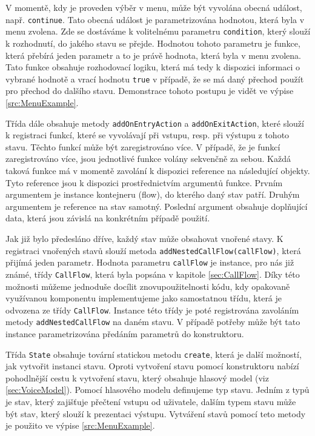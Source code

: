 \documentclass[ing,male,java,dept460,twoside]{diploma}						%
\begin{document}
V momentě, kdy je proveden výběr v menu, může být vyvolána obecná událost, např. \texttt{continue}. Tato obecná událost je parametrizována hodnotou, která byla v menu zvolena. Zde se dostáváme k volitelnému parametru \texttt{condition}, který slouží k rozhodnutí, do jakého stavu se přejde. Hodnotou tohoto parametru je funkce, která přebírá jeden parametr a to je právě hodnota, která byla v menu zvolena. Tato funkce obsahuje rozhodovací logiku, která má tedy k dispozici informaci o vybrané hodnotě a vrací hodnotu \texttt{true} v případě, že se má daný přechod použít pro přechod do dalšího stavu. Demonstrace tohoto postupu je vidět ve výpise \ref{src:MenuExample}.

Třída dále obsahuje metody \texttt{addOnEntryAction} a \texttt{addOnExitAction}, které slouží k registraci funkcí, které se vyvolávají při vstupu, resp. při výstupu z tohoto stavu. Těchto funkcí může být zaregistrováno více. V případě, že je funkcí zaregistrováno více, jsou jednotlivé funkce volány sekvenčně za sebou. Každá taková funkce má v momentě zavolání k dispozici reference na následující objekty. Tyto reference jsou k dispozici prostřednictvím argumentů funkce. Prvním argumentem je instance kontejneru (flow), do kterého daný stav patří. Druhým argumentem je reference na stav samotný. Poslední argument obsahuje doplňující data, která jsou závislá na konkrétním případě použití.

Jak již bylo předesláno dříve, každý stav může obsahovat vnořené stavy. K registraci vnořených stavů slouží metoda \texttt{addNestedCallFlow(callFlow)}, která přijímá jeden parametr. Hodnota parametru \texttt{callFlow} je instance, pro nás již známé, třídy \texttt{CallFlow}, která byla popsána v kapitole \ref{sec:CallFlow}. Díky této možnosti můžeme jednoduše docílit znovupoužitelnosti kódu, kdy opakovaně využívanou komponentu implementujeme jako samostatnou třídu, která je odvozena ze třídy \texttt{CallFlow}. Instance této třídy je poté registrována zavoláním metody \texttt{addNestedCallFlow} na daném stavu. V případě potřeby může být tato instance parametrizována předáním parametrů do konstruktoru.

Třída \texttt{State} obsahuje tovární statickou metodu \texttt{create}, která je další možností, jak vytvořit instanci stavu. Oproti vytvoření stavu pomocí konstruktoru nabízí pohodlnější cestu k vytvoření stavu, který obsahuje hlasový model (viz \ref{sec:VoiceModel}). Pomocí hlasového modelu definujeme typ stavu. Jedním z typů je stav, který zajišťuje přečtení vstupu od uživatele, dalším typem stavu může být stav, který slouží k prezentaci výstupu. Vytváření stavů pomocí teto metody je použito ve výpise \ref{src:MenuExample}.
\end{document}
